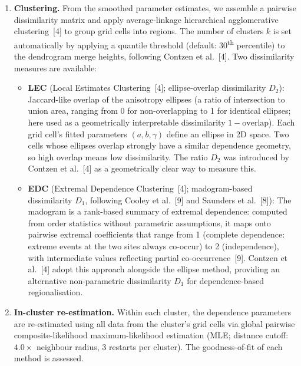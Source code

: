 \documentclass[preprint,12pt,a4paper]{elsarticle}
\newcommand{\rev}[1]{{#1}}
\newcommand{\revo}[1]{{\color{RevisionOrange}#1}}
\newcommand{\revr}[1]{{\color{RevisionRed}#1}}
\begin{document}
\begin{enumerate}
{  periodicity ($+90^{\circ} \equiv -90^{\circ}$).}
\item \textbf{Clustering.}
  From the smoothed parameter estimates, we assemble a pairwise
  dissimilarity matrix and apply average-linkage hierarchical
  agglomerative clustering~[4] to group grid cells into regions.
  The number of clusters $k$ is set automatically by applying a
  quantile threshold (default: 30\textsuperscript{th} percentile)
  to the dendrogram merge heights, following Contzen et al.~[4].
  Two dissimilarity measures are available:
  \begin{itemize}
  \item \textbf{LEC} (Local Estimates Clustering~[4]; ellipse-overlap
    dissimilarity $D_2$): Jaccard-like overlap of the anisotropy
    ellipses\revo{ (a ratio of intersection to union area, ranging
    from 0 for non-overlapping to 1 for identical ellipses; here
    used as a geometrically interpretable dissimilarity $1 - \text{overlap}$)}.
    \revr{Each grid cell's fitted parameters $(a, b, \gamma)$ define
    an ellipse in 2D space. Two cells whose ellipses overlap strongly
    have a similar dependence geometry, so high overlap means low
    dissimilarity. The ratio $D_2$ was introduced by Contzen
    et al.~[4] as a geometrically clear way to measure this.}
  \item \textbf{EDC} (Extremal Dependence Clustering~[4]; madogram-based
    dissimilarity $D_1$, following Cooley et al.~[9] and Saunders et al.~[8]):
    \revo{The madogram is a rank-based summary of extremal
    dependence: computed from order statistics without parametric
    assumptions, it maps onto pairwise extremal coefficients that
    range from 1 (complete dependence: extreme events at the two
    sites always co-occur) to 2 (independence), with intermediate
    values reflecting partial co-occurrence~[9].  Contzen et al.~[4]
    adopt this approach alongside the ellipse method, providing an
    alternative non-parametric dissimilarity $D_1$ for
    dependence-based regionalisation.}
  \end{itemize}
\item \textbf{\rev{In-cluster re-estimation.}}
  \rev{Within each cluster, the dependence parameters are
  re-estimated using all data from the cluster's grid cells via
  global pairwise composite-likelihood maximum-likelihood estimation
  (MLE; distance cutoff: $4.0
  \times$ neighbour radius, 3 restarts per cluster). The
  goodness-of-fit of each method is assessed.}
\end{enumerate}
\end{document}
